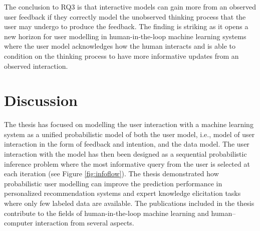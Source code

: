 \documentclass[dissertation,math,vertlayout,pdfa,colorlinks]{aaltoseries}
\begin{document}
The conclusion to RQ3 is that interactive models can gain more from an observed user feedback if they correctly model the unobserved thinking process that the user may undergo to produce the feedback. The finding is striking as it opens a new horizon for user modelling in human-in-the-loop machine learning systems where the user model acknowledges how the human interacts and is able to condition on the thinking process to have more informative updates from an observed interaction.

\chapter{Discussion}

The thesis has focused on modelling the user interaction with a machine learning system as a unified probabilistic model of both the user model, i.e., model of user interaction in the form of feedback and intention, and the data model. The user interaction with the model has then been designed as a sequential probabilistic inference problem where the most informative query from the user is selected at each iteration (see Figure \ref{fig:infoflow}). The thesis demonstrated how probabilistic user modelling can improve the prediction performance in personalized recommendation systems and expert knowledge elicitation tasks where only few labeled data are available. The publications included in the thesis contribute to the fields of human-in-the-loop machine learning and human--computer interaction from several aspects.


\end{document}
